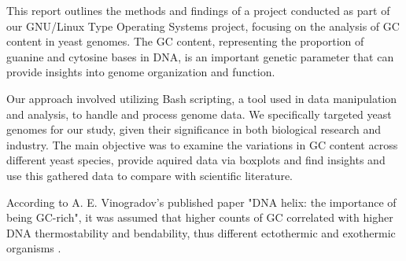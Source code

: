 This report outlines the methods and findings of a project conducted as part of our GNU/Linux Type Operating Systems project, focusing on the analysis of GC content in yeast genomes. The GC content, representing the proportion of guanine and cytosine bases in DNA, is an important genetic parameter that can provide insights into genome organization and function.

Our approach involved utilizing Bash scripting, a tool used in data manipulation and analysis, to handle and process genome data. We specifically targeted yeast genomes for our study, given their significance in both biological research and industry. The main objective was to examine the variations in GC content across different yeast species, provide aquired data via boxplots and find insights and use this gathered data to compare with scientific literature.

According to A. E. Vinogradov's published paper "DNA helix: the importance of being GC-rich", it was assumed that higher counts of GC correlated with higher DNA thermostability and bendability, thus different ectothermic and exothermic organisms \cite{Vinogradov2003}.



